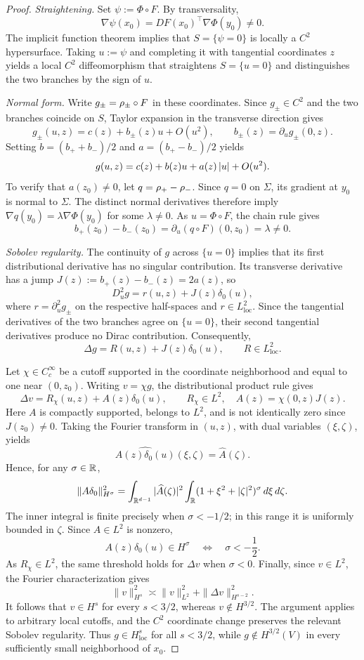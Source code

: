 \begin{proof}
\emph{Straightening.} Set $\psi:=\Phi\circ F$. By transversality,
\[
\nabla\psi(x_0)
=DF(x_0)^\top\nabla\Phi(y_0)\neq0.
\]
The implicit function theorem implies that $S=\{\psi=0\}$
is locally a $C^2$ hypersurface. Taking $u:=\psi$ and
completing it with tangential coordinates $z$ yields a
local $C^2$ diffeomorphism that straightens $S=\{u=0\}$
and distinguishes the two branches by the sign of $u$.

\emph{Normal form.} Write $g_\pm=\rho_\pm\circ F$ in these
coordinates. Since $g_\pm\in C^2$ and the two branches
coincide on $S$, Taylor expansion in the transverse
direction gives
\[
g_\pm(u,z)=c(z)+b_\pm(z)u+O(u^2),
\qquad b_\pm(z)=\partial_u g_\pm(0,z).
\]
Setting $b=(b_++b_-)/2$ and $a=(b_+-b_-)/2$ yields
\[
g(u,z)=c(z)+b(z)u+a(z)\left\lvert u\right\rvert+O(u^2).
\]
To verify that $a(z_0)\neq0$, let $q=\rho_+-\rho_-$.
Since $q=0$ on $\Sigma$, its gradient at $y_0$ is
normal to $\Sigma$. The distinct normal derivatives
therefore imply
$\nabla q(y_0)=\lambda\nabla\Phi(y_0)$ for some
$\lambda\neq0$. As $u=\Phi\circ F$, the chain rule gives
\[
b_+(z_0)-b_-(z_0)
=\partial_u(q\circ F)(0,z_0)=\lambda\neq0.
\]

\emph{Sobolev regularity.} The continuity of $g$ across
$\{u=0\}$ implies that its first distributional derivative
has no singular contribution. Its transverse derivative
has a jump $J(z):=b_+(z)-b_-(z)=2a(z)$, so
\[
D_u^2g=r(u,z)+J(z)\delta_0(u),
\]
where $r=\partial_u^2g_\pm$ on the respective half-spaces
and $r\in L^2_{\mathrm{loc}}$. Since the tangential
derivatives of the two branches agree on $\{u=0\}$,
their second tangential derivatives produce no Dirac
contribution. Consequently,
\[
\Delta g=R(u,z)+J(z)\delta_0(u),
\qquad R\in L^2_{\mathrm{loc}}.
\]

Let $\chi\in C_c^\infty$ be a cutoff supported in the
coordinate neighborhood and equal to one near $(0,z_0)$.
Writing $v=\chi g$, the distributional product rule gives
\[
\Delta v=R_\chi(u,z)+A(z)\delta_0(u),
\qquad R_\chi\in L^2,\quad
A(z)=\chi(0,z)J(z).
\]
Here $A$ is compactly supported, belongs to $L^2$, and
is not identically zero since $J(z_0)\neq0$.
Taking the Fourier transform in $(u,z)$, with dual
variables $(\xi,\zeta)$, yields
\[
\widehat{A(z)\delta_0(u)}(\xi,\zeta)
=\widehat A(\zeta).
\]
Hence, for any $\sigma\in\mathbb{R}$,
\[
\|A\delta_0\|_{H^\sigma}^2
=\int_{\mathbb{R}^{d-1}}|\widehat A(\zeta)|^2
\int_{\mathbb{R}}(1+\xi^2+|\zeta|^2)^\sigma
\,d\xi\,d\zeta.
\]
The inner integral is finite precisely when
$\sigma<-1/2$; in this range it is uniformly bounded
in $\zeta$. Since $A\in L^2$ is nonzero,
\[
A(z)\delta_0(u)\in H^\sigma
\quad\Longleftrightarrow\quad
\sigma<-\frac12.
\]
As $R_\chi\in L^2$, the same threshold holds for
$\Delta v$ when $\sigma<0$. Finally, since $v\in L^2$,
the Fourier characterization gives
\[
\|v\|_{H^s}^2\asymp
\|v\|_{L^2}^2+\|\Delta v\|_{H^{s-2}}^2.
\]
It follows that $v\in H^s$ for every $s<3/2$,
whereas $v\notin H^{3/2}$. The argument applies to
arbitrary local cutoffs, and the $C^2$ coordinate
change preserves the relevant Sobolev regularity.
Thus $g\in H^s_{\mathrm{loc}}$ for all $s<3/2$,
while $g\notin H^{3/2}(V)$ in every sufficiently
small neighborhood of $x_0$.
\end{proof}


